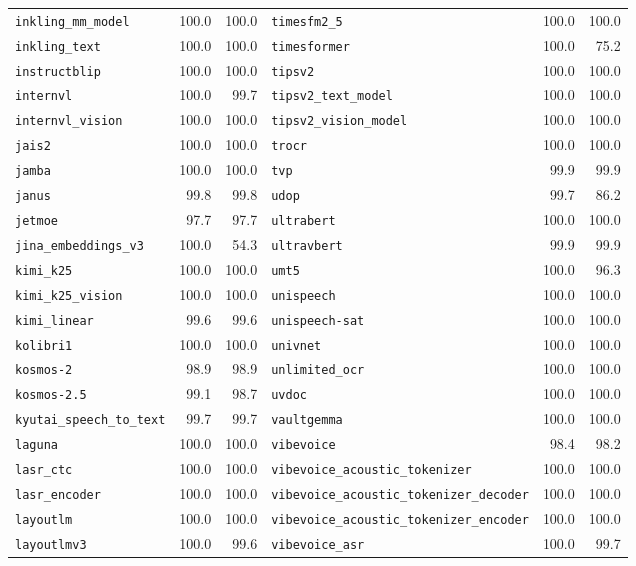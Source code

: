 \begin{longtable}{@{}lrr@{\hspace{24pt}}lrr@{}}
\texttt{inkling\_mm\_model} & 100.0 & 100.0 & \texttt{timesfm2\_5} & 100.0 & 100.0 \\
\texttt{inkling\_text} & 100.0 & 100.0 & \texttt{timesformer} & 100.0 & 75.2 \\
\texttt{instructblip} & 100.0 & 100.0 & \texttt{tipsv2} & 100.0 & 100.0 \\
\texttt{internvl} & 100.0 & 99.7 & \texttt{tipsv2\_text\_model} & 100.0 & 100.0 \\
\texttt{internvl\_vision} & 100.0 & 100.0 & \texttt{tipsv2\_vision\_model} & 100.0 & 100.0 \\
\texttt{jais2} & 100.0 & 100.0 & \texttt{trocr} & 100.0 & 100.0 \\
\texttt{jamba} & 100.0 & 100.0 & \texttt{tvp} & 99.9 & 99.9 \\
\texttt{janus} & 99.8 & 99.8 & \texttt{udop} & 99.7 & 86.2 \\
\texttt{jetmoe} & 97.7 & 97.7 & \texttt{ultrabert} & 100.0 & 100.0 \\
\texttt{jina\_embeddings\_v3} & 100.0 & 54.3 & \texttt{ultravbert} & 99.9 & 99.9 \\
\texttt{kimi\_k25} & 100.0 & 100.0 & \texttt{umt5} & 100.0 & 96.3 \\
\texttt{kimi\_k25\_vision} & 100.0 & 100.0 & \texttt{unispeech} & 100.0 & 100.0 \\
\texttt{kimi\_linear} & 99.6 & 99.6 & \texttt{unispeech-sat} & 100.0 & 100.0 \\
\texttt{kolibri1} & 100.0 & 100.0 & \texttt{univnet} & 100.0 & 100.0 \\
\texttt{kosmos-2} & 98.9 & 98.9 & \texttt{unlimited\_ocr} & 100.0 & 100.0 \\
\texttt{kosmos-2.5} & 99.1 & 98.7 & \texttt{uvdoc} & 100.0 & 100.0 \\
\texttt{kyutai\_speech\_to\_text} & 99.7 & 99.7 & \texttt{vaultgemma} & 100.0 & 100.0 \\
\texttt{laguna} & 100.0 & 100.0 & \texttt{vibevoice} & 98.4 & 98.2 \\
\texttt{lasr\_ctc} & 100.0 & 100.0 & \texttt{vibevoice\_acoustic\_tokenizer} & 100.0 & 100.0 \\
\texttt{lasr\_encoder} & 100.0 & 100.0 & \texttt{vibevoice\_acoustic\_tokenizer\_decoder} & 100.0 & 100.0 \\
\texttt{layoutlm} & 100.0 & 100.0 & \texttt{vibevoice\_acoustic\_tokenizer\_encoder} & 100.0 & 100.0 \\
\texttt{layoutlmv3} & 100.0 & 99.6 & \texttt{vibevoice\_asr} & 100.0 & 99.7 \\

\end{longtable}
